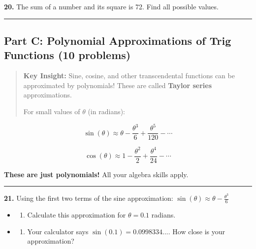 \documentclass[
  11pt,
]{article}
\providecommand{\tightlist}{%
  \setlength{\itemsep}{0pt}\setlength{\parskip}{0pt}}
\begin{document}
\textbf{20.} The sum of a number and its square is 72. Find all possible
values.

\begin{center}\rule{0.5\linewidth}{0.5pt}\end{center}

\hypertarget{part-c-polynomial-approximations-of-trig-functions-10-problems}{%
\subsection{Part C: Polynomial Approximations of Trig Functions (10
problems)}\label{part-c-polynomial-approximations-of-trig-functions-10-problems}}

\begin{quote}
\textbf{Key Insight:} Sine, cosine, and other transcendental functions
can be approximated by polynomials! These are called \textbf{Taylor
series} approximations.

For small values of \(\theta\) (in radians):
\end{quote}

\[\sin(\theta) \approx \theta - \frac{\theta^3}{6} + \frac{\theta^5}{120} - \cdots\]

\[\cos(\theta) \approx 1 - \frac{\theta^2}{2} + \frac{\theta^4}{24} - \cdots\]

\textbf{These are just polynomials!} All your algebra skills apply.

\begin{center}\rule{0.5\linewidth}{0.5pt}\end{center}

\textbf{21.} Using the first two terms of the sine approximation:
\(\sin(\theta) \approx \theta - \frac{\theta^3}{6}\)

\begin{itemize}
\item
  \begin{enumerate}
  \def\labelenumi{(\alph{enumi})}
  \tightlist
  \item
    Calculate this approximation for \(\theta = 0.1\) radians.
  \end{enumerate}
\item
  \begin{enumerate}
  \def\labelenumi{(\alph{enumi})}
  \setcounter{enumi}{1}
  \tightlist
  \item
    Your calculator says \(\sin(0.1) = 0.0998334...\). How close is your
    approximation?
  \end{enumerate}
\end{itemize}
\end{document}
